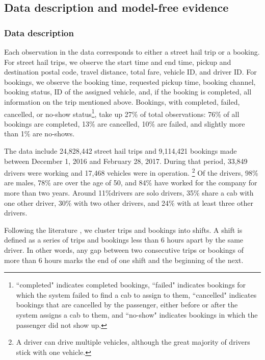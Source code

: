 \documentclass[reviewmode,AEJ]{AEA}
\begin{document}
\subsection{Data description and model-free evidence}

\subsubsection{Data description}
Each observation in the data corresponds to either a street hail trip or a booking. For street hail trips, 
we observe the start time and end time, pickup and destination postal code, 
travel distance, total fare, vehicle ID, and driver ID. For bookings, we observe the booking time, 
requested pickup time, booking channel, booking status,  ID of the assigned vehicle, and, if the booking
is completed, all information on the trip mentioned above. Bookings, with completed, failed, cancelled, 
or no-show status\footnote{``completed" indicates completed bookings, ``failed" indicates bookings for
which the system failed to find a cab to assign to them, ``cancelled" indicates bookings that are cancelled
by the passenger, either before or after the system assigns a cab to them, and ``no-show" indicates bookings 
in which the passenger did not show up.}, take up 27\% of  total observations: 76\% of all bookings are 
completed, 13\% are cancelled, 10\% are failed, and slightly more than 1\% are no-shows.

The data include 24,828,442 street hail trips and 9,114,421 bookings made between December 1, 2016 and
February 28, 2017. During that period, 33,849 drivers were working and 17,468 vehicles were in operation.
\footnote{A driver can drive multiple vehicles, although the great majority of drivers stick with one vehicle.} 
Of the drivers, 98\% are males, 78\% are over the age of 50, and 84\% have worked for the company for more than
two years. Around 11\%drivers are solo drivers, 35\% share a cab with one other driver, 30\% with two other 
drivers, and 24\% with at least three other drivers.

Following the literature \citep{farber2015you,agarwal2015singaporean,martin2017quit,chen2015dynamic}, we 
cluster trips and bookings into shifts. A shift is defined as a series of trips and bookings less than 6 
hours apart by the same driver. In other words, any gap between two consecutive trips or bookings of more
than 6 hours marks the end of one shift and the beginning of the next. 
\end{document}

